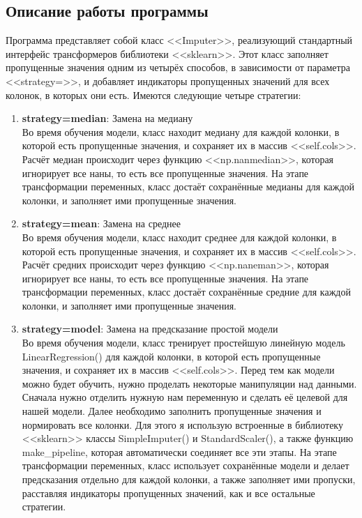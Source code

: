 \documentclass[12pt,a4paper]{article}
\begin{document}
  \subsection{Описание работы программы}
  Программа представляет собой класс <<Imputer>>, реализующий стандартный интерфейс трансформеров библиотеки <<sklearn>>.
  Этот класс заполняет пропущенные значения одним из четырёх способов, в зависимости от параметра <<strategy=>>,
  и добавляет индикаторы пропущенных значений для всех колонок, в которых они есть.
  Имеются следующие четыре стратегии:
  \begin{enumerate}
    \item \textbf{strategy=median}: Замена на медиану \\
      Во время обучения модели, класс находит медиану для каждой колонки,
      в которой есть пропущенные значения, и сохраняет их в массив <<self.cols>>.
      Расчёт медиан происходит через функцию <<np.nanmedian>>, которая игнорирует все наны, то есть все пропущенные значения.
      На этапе трансформации переменных, класс достаёт сохранённые медианы для каждой колонки, и заполняет ими пропущенные значения.

    \item \textbf{strategy=mean}: Замена на среднее \\
      Во время обучения модели, класс находит среднее для каждой колонки,
      в которой есть пропущенные значения, и сохраняет их в массив <<self.cols>>.
      Расчёт средних происходит через функцию <<np.naneman>>, которая игнорирует все наны, то есть все пропущенные значения.
      На этапе трансформации переменных, класс достаёт сохранённые средние для каждой колонки, и заполняет ими пропущенные значения.

    \item \textbf{strategy=model}: Замена на предсказание простой модели \\
      Во время обучения модели, класс тренирует простейшую линейную модель LinearRegression() для каждой колонки,
      в которой есть пропущенные значения, и сохраняет их в массив <<self.cols>>.
      Перед тем как модели можно будет обучить, нужно проделать некоторые манипуляции над данными.
      Сначала нужно отделить нужную нам переменную и сделать её целевой для нашей модели.
      Далее необходимо заполнить пропущенные значения и нормировать все колонки.
      Для этого я использую встроенные в библиотеку <<sklearn>> классы SimpleImputer() и StandardScaler(),
      а также функцию make\_pipeline, которая автоматически соединяет все эти этапы.
      На этапе трансформации переменных, класс использует сохранённые модели и делает предсказания отдельно для каждой колонки,
      а также заполняет ими пропуски, расставляя индикаторы пропущенных значений, как и все остальные стратегии.


\end{enumerate}
\end{document}
